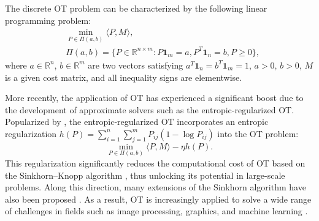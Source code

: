 \documentclass{article}
\theoremstyle{plain}
\theoremstyle{definition}
\theoremstyle{remark}
\begin{document}
The discrete OT problem can be characterized by the following linear programming problem:
\begin{eqnarray*}
 & \underset{P\in\Pi(a,b)}{\min} \langle P,M\rangle,\\
 & \Pi(a,b)=\{P\in\mathbb{R}^{n\times m}:P\mathbf{1}_{m}=a,P^{T}\mathbf{1}_{n}=b,P\ge0\},
\end{eqnarray*}
where $a\in\mathbb{R}^n$, $b\in\mathbb{R}^m$ are two vectors satisfying $a^T \mathbf{1}_n = b^T \mathbf{1}_m = 1$, $a>0$, $b>0$, $M$ is a given cost matrix, and all inequality signs are elementwise.

More recently, the application of OT has experienced a significant boost due to the development of approximate solvers such as the entropic-regularized OT. Popularized by \citet{cuturi2013sinkhorn}, the entropic-regularized OT incorporates an entropic regularization $h(P) = \sum_{i=1}^{n}\sum_{j=1}^{m} P_{ij}(1 - \log P_{ij})$ into the OT problem:
\begin{equation}
\label{eq:sinkhorn}
    \underset{P\in\Pi(a,b)}{\min} \langle P, M \rangle - \eta h(P).
\end{equation}
This regularization significantly reduces the computational cost of OT based on the Sinkhorn--Knopp algorithm \citep{yule1912methods,sinkhorn1964relationship},
thus unlocking its potential in large-scale problems.
Along this direction, many extensions of the Sinkhorn algorithm have also been proposed \citep{altschuler2017nearlinear,dvurechensky2018computational,guminov2021combination,lin2022efficiency}.
As a result, OT is increasingly applied to solve a wide range of challenges in fields such as image processing, graphics, and machine learning \cite{peyre2019computational}.
\end{document}
